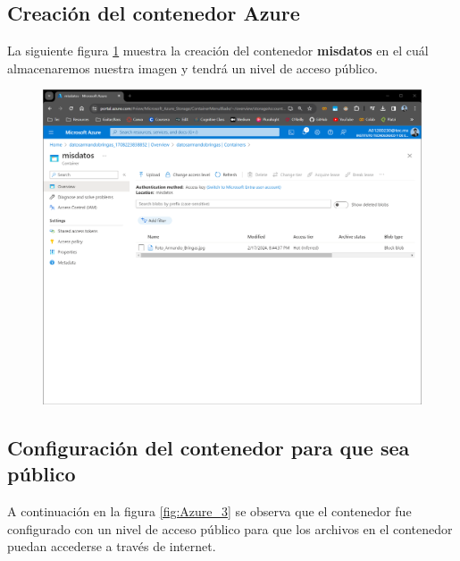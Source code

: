 \documentclass[12pt,a4paper]{article}
\begin{document}
\vspace{3cm}

\subsection{Creación del contenedor Azure}

La siguiente figura \ref{fig:Azure_2} muestra la creación del contenedor \textbf{misdatos} en el cuál almacenaremos nuestra imagen y tendrá un nivel de acceso público.

\begin{figure}[H]
    \centering
    \includegraphics[width=1\linewidth]{M4_Servicios_Cómputo_en_la_Nube/Tarea_4_Crear_contenedores_en_la_nube/reporte/1-2_Creación_contenedor.png}
    \label{fig:Azure_2}
\end{figure}

\vspace{3cm}

\subsection{Configuración del contenedor para que sea público}

A continuación en la figura \ref{fig:Azure_3} se observa que el contenedor fue configurado con un nivel de acceso público para que los archivos en el contenedor puedan accederse a través de internet.
\end{document}
